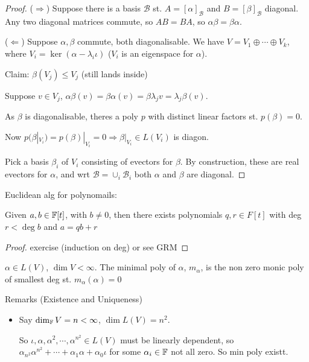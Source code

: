 \documentclass[a4paper]{article}
\begin{document}
\begin{proof}
	($ \Rightarrow $) Suppose there is a basis $ \mathcal{B} $ st. $ A = [ \alpha ]_{\mathcal{B}} $ and $ B = [\beta]_{\mathcal{B}}  $ diagonal. Any two diagonal matrices commute, so $ AB = BA $, so $ \alpha \beta = \beta\alpha $.
	
	
	($ \Leftarrow $) Suppose $ \alpha,\beta $ commute, both diagonalisable. We have $ V = V_{1} \oplus \cdots \oplus V_{k} $, where $ V_{i} = \ker (\alpha - \lambda_{i} \iota ) $ ($ V_{i} $ is an eigenspace for $ \alpha $).
	
	Claim: $ \beta(V_{j}) \leq V_{j} $ (still lands inside)
	
	Suppose $ v \in V_{j} $, $ \alpha \beta(v) = \beta \alpha(v) = \beta \lambda_{j} v = \lambda_{j} \beta (v)  $.
	
	As $ \beta $ is diagonalisable, theres a poly $ p $ with distinct linear factors st. $ p(\beta) = 0 $. 
	
	Now $ p(\beta |_{V_{i}}) = p(\beta)|_{V_{i}} = 0 \Rightarrow \beta |_{V_{i}} \in L(V_{i}) $ is diagon. 
	
	Pick a basis $ \beta_{i} $ of $ V_{i} $ consisting of evectors for $ \beta $. By construction, these are real evectors for $ \alpha $, and wrt $ \mathcal{B} = \cup_{i} \mathcal{B}_{i}  $ both $ \alpha $ and $ \beta $ are diagonal. 
 	
	
\end{proof}


\begin{lemma} 
	Euclidean alg for polynomails:
	
	Given $ a,b \in \mathbb{F}[t] $, with $ b \neq 0 $, then there exists polynomials $ q,r \in F[t] $ with deg $ r  < \deg b$ and $ a = qb + r $ 
\end{lemma}

\begin{proof}
	exercise (induction on deg) or see GRM
\end{proof}

\begin{defi}
	$ \alpha \in L(V) $, $ \dim V < \infty $. The minimal poly of $ \alpha $, $ m_{\alpha} $, is the non zero monic poly of smallest deg st. $ m_{\alpha}(\alpha) = 0 $
\end{defi}


Remarks (Existence and Uniqueness)
\begin{itemize}
	\item Say $ \dim_{\mathbb{F}} V = n < \infty $, $ \dim L(V) = n^{2} $.
	
	So $ \iota, \alpha,\alpha^{2},\cdots,\alpha^{n^{2}} \in L(V) $ must be linearly dependent, so $ \alpha_{n^{2}}  \alpha^{n^{2}} + \cdots + \alpha_{1} \alpha  + \alpha_{0} \iota $ for some $ \alpha_{i} \in \mathbb{F} $ not all zero. So min poly existt.  
\end{itemize}
\end{document}
